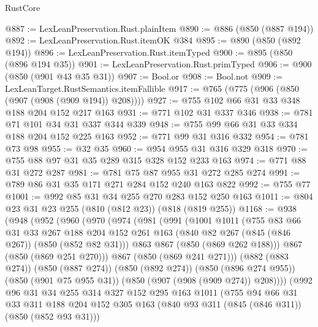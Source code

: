 \begin{lexlean}{RustCore}
\begin{coremodule}
@887 := LexLeanPreservation.Rust.plainItem
@890 := @886 (@850 (@887 @194))
@892 := LexLeanPreservation.Rust.itemOK @384
@895 := @890 (@850 (@892 @194))
@896 := LexLeanPreservation.Rust.itemTyped
@900 := @895 (@850 (@896 @194 @35))
@901 := LexLeanPreservation.Rust.primTyped
@906 := @900 (@850 (@901 @43 @35 @31))
@907 := Bool.or
@908 := Bool.not
@909 := LexLeanTarget.RustSemantics.itemFallible
@917 := @765 (@775 (@906 (@850 (@907 (@908 (@909 @194)) @208))))
@927 := @755 @102 @66 @31 @33 @348 @188 @204 @152 @217 @163
@931 := @771 @102 @31 @337 @346
@938 := @781 @71 @101 @34 @31 @337 @344 @339
@948 := @755 @99 @66 @31 @33 @334 @188 @204 @152 @225 @163
@952 := @771 @99 @31 @316 @332
@954 := @781 @73 @98
@955 := @32 @35
@960 := @954 @955 @31 @316 @329 @318
@970 := @755 @88 @97 @31 @35 @289 @315 @328 @152 @233 @163
@974 := @771 @88 @31 @272 @287
@981 := @781 @75 @87 @955 @31 @272 @285 @274
@991 := @789 @86 @31 @35 @171 @271 @284 @152 @240 @163 @822
@992 := @755 @77
@1001 := @992 @85 @31 @34 @255 @270 @283 @152 @250 @163
@1011 := @804 @23 @31 @23 @255 (@810 (@812 @23)) (@818 (@819 @255))
@1168 := @938
    (@948
      (@952
        (@960
          (@970
            (@974
              (@981
                (@991
                  (@1001
                    @1011
                    (@755
                      @83
                      @66
                      @31
                      @33
                      @267
                      @188
                      @204
                      @152
                      @261
                      @163
                      (@840 @82 @267 (@845 (@846 @267)) (@850 (@852 @82 @31)))
                      @863
                      @867
                      (@850 (@869 @262 @188)))
                    @867
                    (@850 (@869 @251 @270)))
                  @867
                  (@850 (@869 @241 @271)))
                (@882 (@883 @274))
                (@850 (@887 @274))
                (@850 (@892 @274))
                (@850 (@896 @274 @955))
                (@850 (@901 @75 @955 @31))
                (@850 (@907 (@908 (@909 @274)) @208))))
            (@992
              @96
              @31
              @34
              @255
              @314
              @327
              @152
              @295
              @163
              @1011
              (@755
                @94
                @66
                @31
                @33
                @311
                @188
                @204
                @152
                @305
                @163
                (@840 @93 @311 (@845 (@846 @311)) (@850 (@852 @93 @31)))

\end{coremodule}
\end{lexlean}
